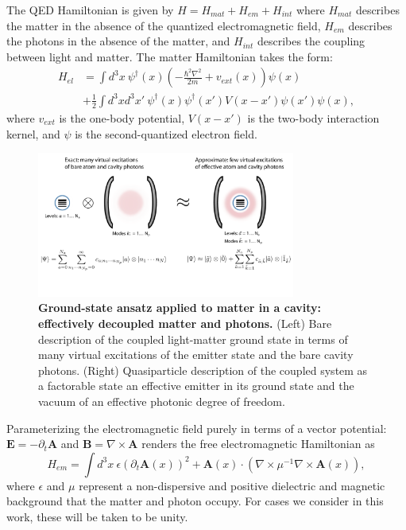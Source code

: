 \documentclass[aps,prl,twocolumn,
	groupedaddress,superscriptaddress,
	amsfonts,amssymb,amsmath,floatfix,
	citeautoscript]{revtex4-1}
\newcommand{\Jadd}[1]{\textcolor{blue}{#1}}
\begin{document}
The QED Hamiltonian is given by $H = H_{mat}+H_{em}+H_{int}$ where $H_{mat}$ describes the matter in the absence of the quantized electromagnetic field, $H_{em}$ describes the photons in the absence of the matter, and $H_{int}$ describes the coupling between light and matter. The matter Hamiltonian takes the form:
\begin{align}
H_{el} &= \int d^3x ~\psi^{\dagger}(x)\left(-\frac{\hbar^2\nabla^2}{2m} + v_{ext}(x) \right)\psi(x) \nonumber \\ &+ \frac{1}{2}\int d^3x d^3x'~ \psi^{\dagger}(x)\psi^{\dagger}(x')V(x-x')\psi(x')\psi(x),
\end{align}
where $v_{ext}$ is the one-body potential, $V(x-x')$ is the two-body interaction kernel, and $\psi$ is the second-quantized electron field. %
\begin{figure}[t]
\includegraphics[width=8.5cm]{conceptfigure.pdf}
\caption{\textbf{Ground-state ansatz applied to matter in a cavity: effectively decoupled matter and photons.} (Left) Bare description of the coupled light-matter ground state in terms of many virtual excitations of the emitter state and the bare cavity photons. (Right) Quasiparticle description of the coupled system as a factorable state an effective emitter in its ground state and the vacuum of an effective photonic degree of freedom.}
\label{fig:ansatz}
\end{figure}
Parameterizing the electromagnetic field purely in terms of a vector potential: $\mathbf{E} = -\partial_t\mathbf{A}$ and $\mathbf{B} = \nabla\times\mathbf{A}$ renders the free electromagnetic Hamiltonian as
\begin{equation}
H_{em} = \int d^3x~ \epsilon (\partial_t \mathbf{A}(x))^2 + \mathbf{A}(x)\cdot(\nabla\times\mu^{-1}\nabla\times\mathbf{A}(x)),
\end{equation}
where $\epsilon$ and $\mu$ represent a non-dispersive and positive dielectric and magnetic background that the matter and photon occupy. For cases we consider in this work, these will be taken to be unity.
\end{document}
